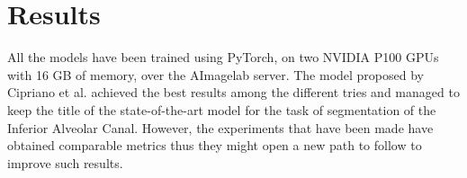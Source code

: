 \section{Results}
All the models have been trained using PyTorch, on two NVIDIA P100 GPUs with 16
GB of memory, over the AImagelab server.
The model proposed by Cipriano et al. achieved the best results among the
different tries and managed to keep the title of the state-of-the-art model for
the task of segmentation of the Inferior Alveolar Canal. However, the
experiments that have been made have obtained comparable metrics thus they might
open a new path to follow to improve such results.

